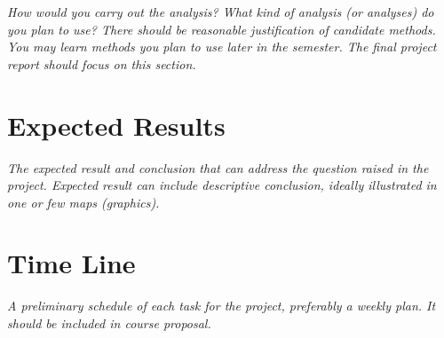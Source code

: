 \documentclass[11pt]{article}
\begin{document}
\textit{How would you carry out the analysis? What kind of analysis (or analyses) do you plan to use? There should be reasonable justification of candidate methods. You may learn methods you plan to use later in the semester. The final project report should focus on this section.}

\section{Expected Results}

\textit{The expected result and conclusion that can address the question raised in the project. Expected result can include descriptive conclusion, ideally illustrated in one or few maps (graphics).}

\section{Time Line}

\textit{A preliminary schedule of each task for the project, preferably a weekly plan. It should be included in course proposal.}

\printbibliography
\end{document}
